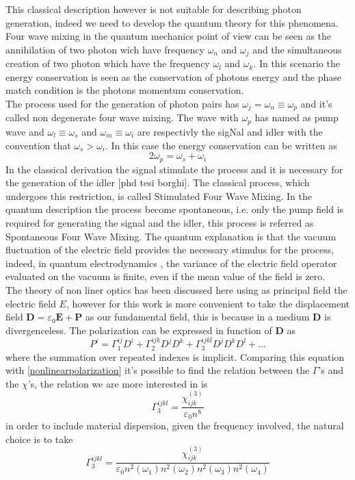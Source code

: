 \documentclass[12pt]{book}
\begin{document}
This classical description however is not suitable for describing photon generation, indeed we need to develop the quantum theory for this phenomena. Four wave mixing in the quantum mechanics point of view can be seen as the annihilation of two photon wich have frequency $\omega_n$ and $\omega_j$ and the simultaneous creation of two photon which have the frequency $\omega_l$ and $\omega_k$. In this scenario the energy conservation is seen as the conservation of photons energy and the phase match condition is the photons momentum conservation.\\
The process used for the generation of photon pairs has $\omega_j = \omega_n \equiv \omega_p$ and it's called non degenerate four wave mixing. The wave with $\omega_p$ has named as pump wave and $\omega_l\equiv \omega_s$ and $\omega_m \equiv \omega_i$ are respectivly the sigNal and idler with the convention that $\omega_s > \omega_i$. In this case the energy conservation can be written as
\begin{equation}2\omega_p = \omega_s + \omega_i\end{equation}
In the classical derivation the signal stimulate the process and it is necessary for the generation of the idler [phd tesi borghi]. The classical process, which undergoes this restriction, is called Stimulated Four Wave Mixing. In the quantum description the process become spontaneous, i.e. only the pump field is required for generating the signal and the idler, this process is referred as Spontaneous Four Wave Mixing. The quantum explanation is that the vacuum fluctuation of the electric field provides the necessary stimulus for the process, indeed, in quantum electrodynamics \cite{book:cohen}, the variance of the electric field operator evaluated on the vacuum is finite, even if the mean value of the field is zero.\\
The theory of non liner optics has been discussed here using as principal field the electric field $E$, however for this work is more convenient to take the displacement field $\mathbf{D} = \varepsilon_0\mathbf{E} +\mathbf{P} $ as our fundamental field, this is because in a medium $\mathbf{D}$ is divergenceless. The polarization can be expressed in function of $\mathbf{D}$ as
\begin{equation}P^i = \Gamma^{ij}_1D^i +\Gamma_2^{ijk}D^jD^k + \Gamma_3^{ijkl}D^jD^kD^l + \dots\end{equation}
where the summation over repeated indexes is implicit. Comparing this equation with \eqref{nonlinearpolarization} it's possible to find the relation between the $\Gamma$'s and the $\chi$'s, the relation we are more interested in is
\begin{equation}\Gamma_3^{ijkl} = \frac{\chi_{ijk}^{(3)}}{\varepsilon_0 n^8}\end{equation}
in order to include material dispersion, given the frequency involved, the natural choice is to take
\begin{equation}\Gamma_3^{ijkl} = \frac{\chi_{ijk}^{(3)}}{\varepsilon_0 n^2(\omega_1)n^2(\omega_2)n^2(\omega_3)n^2(\omega_4)}\end{equation}
\end{document}
